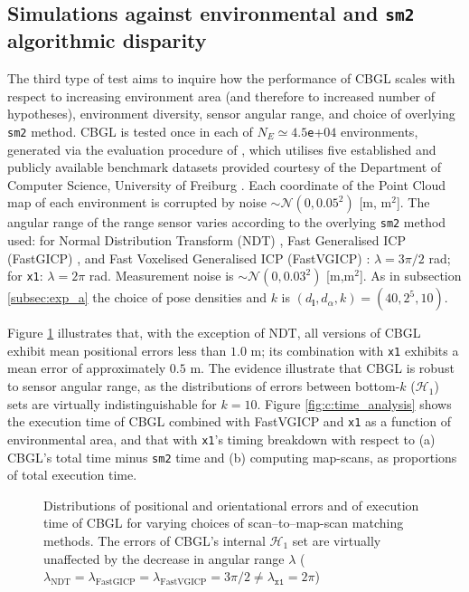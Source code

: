 \subsection{Simulations against environmental and \texttt{sm2} algorithmic disparity}
\label{subsec:exp_c}

The third type of test aims to inquire how the performance of CBGL scales with
respect to increasing environment area (and therefore to increased number of
hypotheses), environment diversity, sensor angular range, and choice of
overlying \texttt{sm2} method. CBGL is tested once in each of $N_E \simeq
4.5$\texttt{e}+$04$ environments, generated via the evaluation procedure of
\cite{Filotheou2023a}, which utilises five established and publicly available
benchmark datasets provided courtesy of the Department of Computer Science,
University of Freiburg \cite{datasets_link}. Each coordinate of the Point Cloud
map of each environment is corrupted by noise $\sim\mathcal{N}(0,0.05^2)$ [m,
m$^2$].  The angular range of the range sensor varies according to the
overlying \texttt{sm2} method used: for Normal Distribution Transform (NDT)
\cite{ndt}, Fast Generalised ICP (FastGICP) \cite{fgi}, and Fast Voxelised
Generalised ICP (FastVGICP) \cite{fvg}: $\lambda = 3\pi/2$ rad; for
\texttt{x1}: $\lambda = 2\pi$ rad. Measurement noise is $\sim
\mathcal{N}(0,0.03^2)$ [m,m$^2$]. As in subsection \ref{subsec:exp_a} the
choice of pose densities and $k$ is $(d_{\bm{l}},d_{\alpha},k) = (40, 2^5,
10)$.

Figure \ref{fig:c:errors_and_time} illustrates that, with the exception of NDT,
all versions of CBGL exhibit mean positional errors less than $1.0$ m; its
combination with \texttt{x1} exhibits a mean error of approximately $0.5$ m.
The evidence illustrate that CBGL is robust to sensor angular range, as the
distributions of errors between bottom-$k$ ($\mathcal{H}_1$) sets are
virtually indistinguishable for $k=10$. Figure \ref{fig:c:time_analysis} shows
the execution time of CBGL combined with FastVGICP and \texttt{x1} as a
function of environmental area, and that with \texttt{x1}'s timing breakdown
with respect to (a) CBGL's total time minus \texttt{sm2} time and (b) computing
map-scans, as proportions of total execution time.

\begin{figure}
  \vspace{0.3cm}
  
  \vspace{0.1cm}
  \caption{\small Distributions of positional and orientational errors and of
           execution time of CBGL for varying choices of scan--to--map-scan
           matching methods. The errors of CBGL's internal $\mathcal{H}_1$ set
           are virtually unaffected by the decrease in angular range $\lambda$
           ($\lambda_{\text{NDT}} = \lambda_{\text{FastGICP}} =
           \lambda_{\text{FastVGICP}} = 3\pi/2 \neq \lambda_{\texttt{x1}} = 2\pi$)
           }
  \label{fig:c:errors_and_time}
\end{figure}

